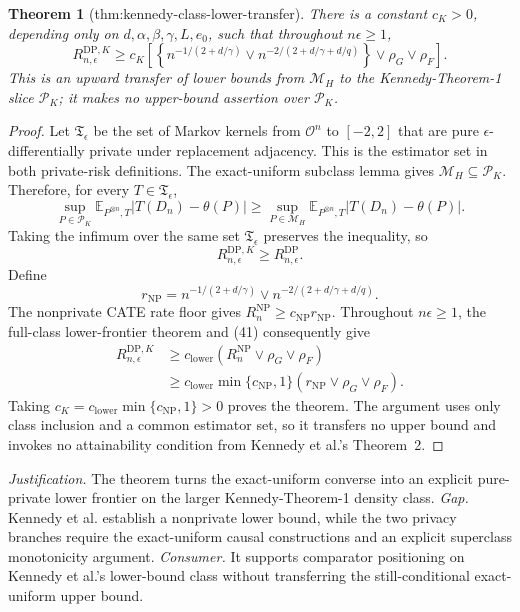 \documentclass{article}
\newtheorem{theorem}{Theorem}
\begin{document}
\begin{theorem}[thm:kennedy-class-lower-transfer]\label{thm:kennedy-class-lower-transfer}
There is a constant \(c_K>0\), depending only on \(d,\alpha,\beta,\gamma,L,e_0\), such that throughout \(n\epsilon\ge1\),
\[
R_{n,\epsilon}^{\mathrm{DP},K}
\ge c_K\left[
\left\{n^{-1/(2+d/\gamma)}\vee
n^{-2/(2+d/\gamma+d/q)}\right\}
\vee\rho_G\vee\rho_F
\right].
\]
This is an upward transfer of lower bounds from \(\mathcal M_H\) to the Kennedy-Theorem-1 slice \(\mathcal P_K\); it makes no upper-bound assertion over \(\mathcal P_K\).
\end{theorem}
\begin{proof}
Let \(\mathfrak T_\epsilon\) be the set of Markov kernels from \(\mathcal O^n\) to \([-2,2]\) that are pure \(\epsilon\)-differentially private under replacement adjacency.  This is the estimator set in both private-risk definitions.  The exact-uniform subclass lemma gives \(\mathcal M_H\subseteq\mathcal P_K\).  Therefore, for every \(T\in\mathfrak T_\epsilon\),
\[
 \sup_{P\in\mathcal P_K}\mathbb E_{P^{\otimes n},T}|T(D_n)-\theta(P)|
 \ge
 \sup_{P\in\mathcal M_H}\mathbb E_{P^{\otimes n},T}|T(D_n)-\theta(P)|.
\]
Taking the infimum over the same set \(\mathfrak T_\epsilon\) preserves the inequality, so
\[
 R_{n,\epsilon}^{\mathrm{DP},K}\ge R_{n,\epsilon}^{\mathrm{DP}}.
 \tag{41}
\]
Define
\[
 r_{\mathrm{NP}}=n^{-1/(2+d/\gamma)}\vee n^{-2/(2+d/\gamma+d/q)}.
\]
The nonprivate CATE rate floor gives \(R_n^{\mathrm{NP}}\ge c_{\mathrm{NP}}r_{\mathrm{NP}}\).  Throughout \(n\epsilon\ge1\), the full-class lower-frontier theorem and (41) consequently give
\[
\begin{split}
 R_{n,\epsilon}^{\mathrm{DP},K}
 &\ge c_{\mathrm{lower}}
 \left(R_n^{\mathrm{NP}}\vee\rho_G\vee\rho_F\right)\\
 &\ge c_{\mathrm{lower}}\min\{c_{\mathrm{NP}},1\}
 \left(r_{\mathrm{NP}}\vee\rho_G\vee\rho_F\right).
\end{split}
\]
Taking \(c_K=c_{\mathrm{lower}}\min\{c_{\mathrm{NP}},1\}>0\) proves the theorem.  The argument uses only class inclusion and a common estimator set, so it transfers no upper bound and invokes no attainability condition from Kennedy et al.'s Theorem~2.
\end{proof}
\par\smallskip\noindent \textit{Justification.} The theorem turns the exact-uniform converse into an explicit pure-private lower frontier on the larger Kennedy-Theorem-1 density class. \textit{Gap.} Kennedy et al. establish a nonprivate lower bound, while the two privacy branches require the exact-uniform causal constructions and an explicit superclass monotonicity argument. \textit{Consumer.} It supports comparator positioning on Kennedy et al.'s lower-bound class without transferring the still-conditional exact-uniform upper bound.
\end{document}
